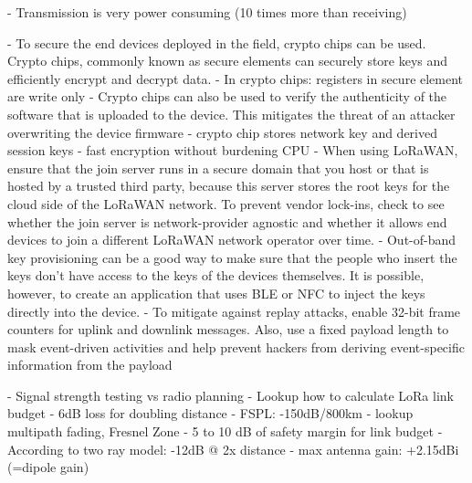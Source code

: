 - Transmission is very power consuming (10 times more than receiving)

- To secure the end devices deployed in the field, crypto chips can be used. Crypto chips, commonly known as secure elements 
  can securely store keys and efficiently encrypt and decrypt data.
- In crypto chips: registers in secure element are write only
- Crypto chips can also be used to verify the authenticity of the software that is uploaded to the device. 
  This mitigates the threat of an attacker overwriting the device firmware
- crypto chip stores network key and derived session keys 
- fast encryption without burdening CPU 
- When using LoRaWAN, ensure that the join server runs in a secure domain that you host or that is hosted by a trusted third party, because this server stores the root keys for the cloud 
  side of the LoRaWAN network. To prevent vendor lock-ins, check to see whether the join server is 
  network-provider agnostic and whether it allows end devices to join a different LoRaWAN network operator over time.
- Out-of-band key provisioning can be a good way to make sure that the people who insert the keys don’t have access to the keys of the devices themselves. 
  It is possible, however, to create an application that uses BLE or NFC to inject the keys directly into the device.
- To mitigate against replay attacks, enable 32-bit frame counters for uplink and downlink messages. Also, use a fixed payload length to mask event-driven 
  activities and help prevent hackers from deriving event-specific information from the payload

- Signal strength testing vs radio planning
- Lookup how to calculate LoRa link budget
- 6dB loss for doubling distance
- FSPL: -150dB/800km
- lookup multipath fading, Fresnel Zone
- 5 to 10 dB of safety margin for link budget
- According to two ray model: -12dB @ 2x distance
- max antenna gain: +2.15dBi (=dipole gain)

